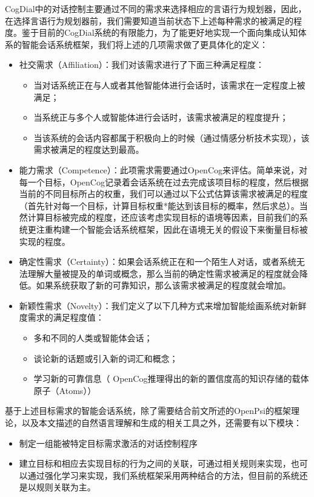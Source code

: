 CogDial中的对话控制主要通过不同的需求来选择相应的言语行为规划器，因此，在选择言语行为规划器前，我们需要知道当前状态下上述每种需求的被满足的程度。鉴于目前的CogDial系统的有限能力，为了能更好地实现一个面向集成认知体系的智能会话系统框架，我们将上述的几项需求做了更具体化的定义：

\begin{itemize}
\item 社交需求（Affiliation）：我们对该需求进行了下面三种满足程度：
\begin{itemize}
\item 当对话系统正在与人或者其他智能体进行会话时，该需求在一定程度上被满足；
\item 当系统正与多个人或智能体进行会话时，该需求被满足的程度提升；
\item  当该系统的会话内容都属于积极向上的时候（通过情感分析技术实现），该需求被满足的程度达到最高。
\end{itemize}
\item 能力需求（Competence）：此项需求需要通过OpenCog来评估。简单来说，对每一个目标，OpenCog记录着会话系统在过去完成该项目标的程度，然后根据当前的不同目标所占的权重，我们可以通过以下公式估算该需求被满足的程度（首先针对每一个目标，计算目标权重*能达到该目标的概率，然后求总）。当然计算目标被完成的程度，还应该考虑实现目标的语境等因素，目前我们的系统更注重构建一个智能会话系统框架，因此在语境无关的假设下来衡量目标被实现的程度。
\item 确定性需求（Certainty）：如果会话系统正在和一个陌生人对话，或者系统无法理解大量被提及的单词或概念，那么当前的确定性需求被满足的程度就会降低。如果系统获取了新的可靠知识，那么该需求被满足的程度就会增加。
\item 新颖性需求（Novelty）：我们定义了以下几种方式来增加智能绘画系统对新鲜度需求的满足程度值：
\begin{itemize}
\item 多和不同的人类或智能体会话；
\item 谈论新的话题或引入新的词汇和概念；
\item 学习新的可靠信息（ OpenCog推理得出的新的置信度高的知识存储的载体原子（Atoms））
\end{itemize}
\end{itemize}

基于上述目标需求的智能会话系统，除了需要结合前文所述的OpenPsi的框架理论，以及本文描述的自然语言理解和生成的相关工具之外，还需要有以下模块：
\begin{itemize}
\item 制定一组能被特定目标需求激活的对话控制程序
\item 建立目标和相应去实现目标的行为之间的关联，可通过相关规则来实现，也可以通过强化学习来实现，我们系统框架采用两种结合的方法，但目前的系统还是以规则关联为主。
\end{itemize}
  

